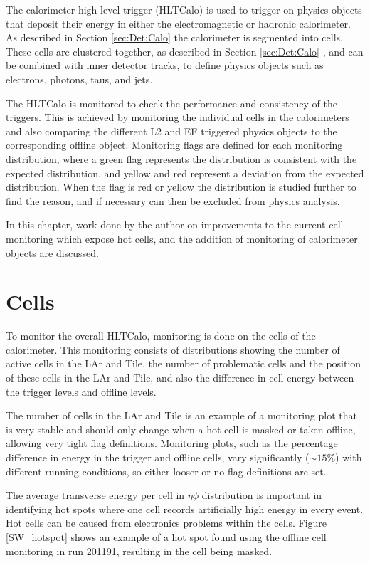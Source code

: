 The calorimeter high-level trigger (HLTCalo) is used to trigger on physics objects that deposit their energy in either the electromagnetic or hadronic calorimeter.
As described in Section \ref{sec:Det:Calo} the calorimeter is segmented into cells.
These cells are clustered together, as described in Section \ref{sec:Det:Calo} , and can be combined with inner detector tracks, to define physics objects such as electrons, photons, taus, and jets. 

The HLTCalo is monitored to check the performance and consistency of the triggers. 
This is achieved by monitoring the individual cells in the calorimeters and also comparing the different L2 and EF triggered physics objects to the corresponding offline object.
Monitoring flags are defined for each monitoring distribution, where a green flag represents the distribution is consistent with the expected distribution, and yellow and red represent a deviation from the expected distribution. 
When the flag is red or yellow the distribution is studied further to find the reason, and if necessary can then be excluded from physics analysis.


In this chapter, work done by the author on improvements to the current cell monitoring which expose hot cells, and the addition of monitoring of calorimeter objects are discussed. 

\section{Cells}

To monitor the overall HLTCalo, monitoring is done on the cells of the calorimeter.
This monitoring consists of distributions showing the number of active cells in the LAr and Tile, the number of problematic cells and the position of these cells in the LAr and Tile, and also the difference in cell energy between the trigger levels and offline levels.

The number of cells in the LAr and Tile is an example of a monitoring plot that is very stable and  should only change when a hot cell is masked or taken offline, allowing very tight flag definitions.
Monitoring plots, such as the percentage difference in energy in the trigger and offline cells, vary significantly ($\sim15\%$) with different running conditions, so either looser or no flag definitions are set.

The average transverse energy per cell in $\eta  \phi$ distribution is important in identifying hot spots where one cell records artificially high energy in every event.
Hot cells can be caused from electronics problems within the cells. 
Figure \ref{SW_hotspot} shows an example of a hot spot found using the offline cell monitoring in run 201191, resulting in the cell being masked.

